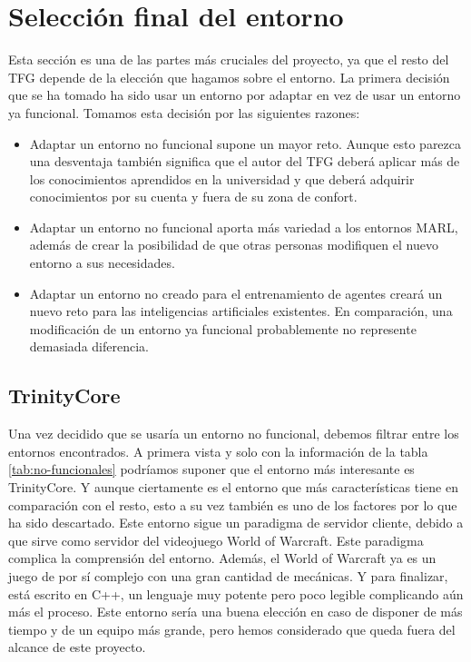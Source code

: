 \chapter{Selección final del entorno}
Esta sección es una de las partes más cruciales del proyecto, ya que el resto del TFG depende de la elección que hagamos sobre el entorno. La primera decisión que se ha tomado ha sido usar un entorno por adaptar en vez de usar un entorno ya funcional. Tomamos esta decisión por las siguientes razones:

\begin{itemize}
    \item Adaptar un entorno no funcional supone un mayor reto. Aunque esto parezca una desventaja también significa que el autor del TFG deberá aplicar más de los conocimientos aprendidos en la universidad y que deberá adquirir conocimientos por su cuenta y fuera de su zona de confort.
    \item Adaptar un entorno no funcional aporta más variedad a los entornos MARL, además de crear la posibilidad de que otras personas modifiquen el nuevo entorno a sus necesidades.
    \item Adaptar un entorno no creado para el entrenamiento de agentes creará un nuevo reto para las inteligencias artificiales existentes. En comparación, una modificación de un entorno ya funcional probablemente no represente demasiada diferencia.
\end{itemize}

\section{TrinityCore}

Una vez decidido que se usaría un entorno no funcional, debemos filtrar entre los entornos encontrados. A primera vista y solo con la información de la tabla \ref {tab:no-funcionales} podríamos suponer que el entorno más interesante es TrinityCore. Y aunque ciertamente es el entorno que más características tiene en comparación con el resto, esto a su vez también es uno de los factores por lo que ha sido descartado. Este entorno sigue un paradigma de servidor cliente, debido a que sirve como servidor del videojuego World of Warcraft. Este paradigma complica la comprensión del entorno. Además, el World of Warcraft ya es un juego de por sí complejo con una gran cantidad de mecánicas. Y para finalizar, está escrito en C++, un lenguaje muy potente pero poco legible complicando aún más el proceso. Este entorno sería una buena elección en caso de disponer de más tiempo y de un equipo más grande, pero  hemos considerado que queda fuera del alcance de este proyecto.

